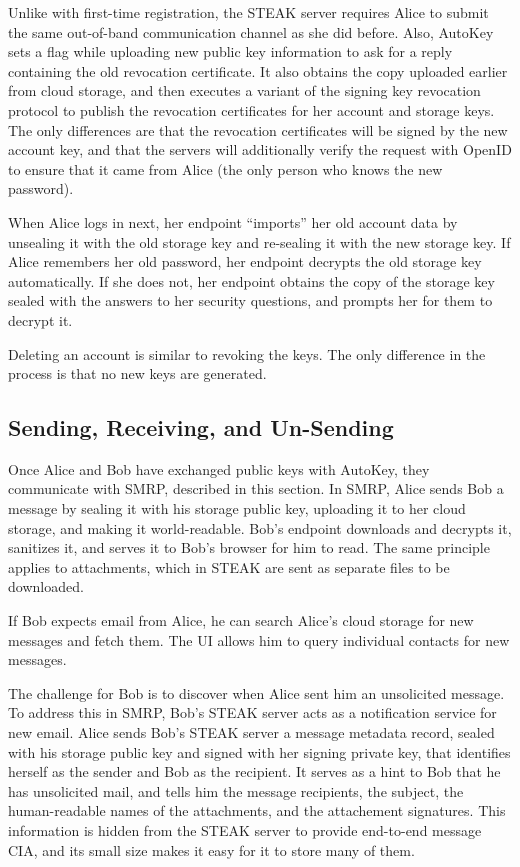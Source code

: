 Unlike with first-time registration, the STEAK server requires Alice to submit the same out-of-band communication channel as she did before.  Also, AutoKey sets a flag while uploading new public key information to ask for a reply containing the old revocation certificate.  It also obtains the copy uploaded earlier from cloud storage, and then executes a variant of the signing key revocation protocol to publish the revocation certificates for her account and storage keys.  The only differences are that the revocation certificates will be signed by the new account key, and that the servers will additionally verify the request with OpenID to ensure that it came from Alice (the only person who knows the new password).

When Alice logs in next, her endpoint “imports” her old account data by unsealing it with the old storage key and re-sealing it with the new storage key.  If Alice remembers her old password, her endpoint decrypts the old storage key automatically.  If she does not, her endpoint obtains the copy of the storage key sealed with the answers to her security questions, and prompts her for them to decrypt it.

Deleting an account is similar to revoking the keys.  The only difference in the process is that no new keys are generated.

\subsection{Sending, Receiving, and Un-Sending}
Once Alice and Bob have exchanged public keys with AutoKey, they communicate with SMRP, described in this section.  In SMRP, Alice sends Bob a message by sealing it with his storage public key, uploading it to her cloud storage, and making it world-readable. Bob’s endpoint downloads and decrypts it, sanitizes it, and serves it to Bob’s browser for him to read. The same principle applies to attachments, which in STEAK are sent as separate files to be downloaded.

If Bob expects email from Alice, he can search Alice’s cloud storage for new messages and fetch them.  The UI allows him to query individual contacts for new messages.

The challenge for Bob is to discover when Alice sent him an unsolicited message.  To address this in SMRP, Bob’s STEAK server acts as a notification service for new email.  Alice sends Bob's STEAK server a message metadata record, sealed with his storage public key and signed with her signing private key, that identifies herself as the sender and Bob as the recipient.  It serves as a hint to Bob that he has unsolicited mail, and tells him the message recipients, the subject, the human-readable names of the attachments, and the attachement signatures.  This information is hidden from the STEAK server to provide end-to-end message CIA, and its small size makes it easy for it to store many of them.

